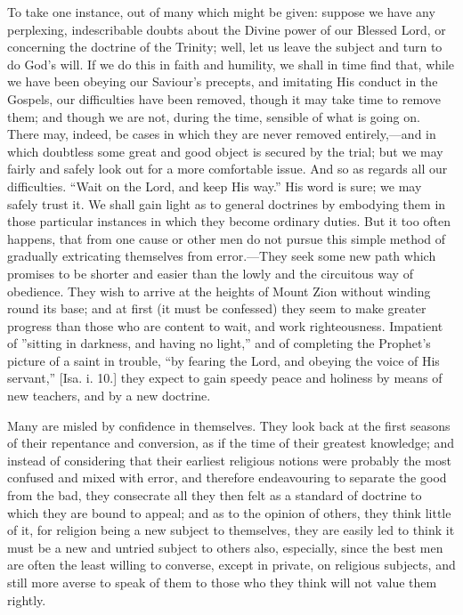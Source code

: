 To take one instance, out of many which might be
given: suppose we have any perplexing, indescribable
doubts about the Divine power of our Blessed Lord, or concerning the doctrine of the Trinity; well, let us
leave the subject and turn to do God's will. If we do
this in faith and humility, we shall in time find that,
while we have been obeying our Saviour's precepts, and
imitating His conduct in the Gospels, our difficulties
have been removed, though it may take time to remove
them; and though we are not, during the time, sensible of
what is going on. There may, indeed, be cases in which
they are never removed entirely,—and in which
doubtless some great and good object is secured by the
trial; but we may fairly and safely look out for a more
comfortable issue. And so as regards all our
difficulties. ``Wait on the Lord, and keep His
way.'' His word is sure; we may safely trust it. We
shall gain light as to general doctrines by embodying
them in those particular instances in which they become
ordinary duties. But it too often happens, that from one
cause or other men do not pursue this simple method of
gradually extricating themselves from error.—They
seek some new path which promises to be shorter and
easier than the lowly and the circuitous way of
obedience. They wish to arrive at the heights of Mount
Zion without winding round its base; and at first (it
must be confessed) they seem to make greater progress
than those who are content to wait, and work
righteousness. Impatient of ''sitting in darkness, and
having no light,'' and of completing the Prophet's
picture of a saint in trouble, ``by fearing the Lord,
and obeying the voice of His servant,'' [Isa. i. 10.]
they expect to gain speedy peace and holiness by means of
new teachers, and by a new doctrine.

Many are misled by confidence in themselves. They look
back at the first seasons of their repentance and
conversion, as if the time of their greatest knowledge;
and instead of considering that their earliest religious
notions were probably the most confused and mixed with
error, and therefore endeavouring to separate the good
from the bad, they consecrate all they then felt as a
standard of doctrine to which they are bound to appeal;
and as to the opinion of others, they think little of it,
for religion being a new subject to themselves, they are
easily led to think it must be a new and untried subject
to others also, especially, since the best men are often
the least willing to converse, except in private, on
religious subjects, and still more averse to speak of
them to those who they think will not value them rightly.

